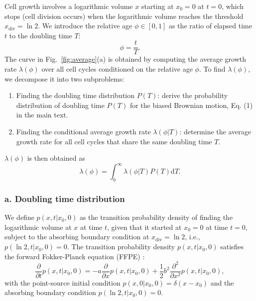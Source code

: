 \documentclass[aps, prl, longbibliography, linenumbers, superscriptaddress]{revtex4-2}
\begin{document}
Cell growth involves a logarithmic volume $x$ starting at $x_0 = 0$ at $t=0$, which stops (cell division occurs) when the logarithmic volume reaches the threshold $x_{\text{div}} = \ln2$. We introduce the relative age $\phi \in [0, 1]$ as the ratio of elapsed time $t$ to the doubling time $T$:
\begin{equation}
	\phi = \frac{t}{T}.
\end{equation}
The curve in Fig.~\ref{fig:average}(a) is obtained by computing the average growth rate $\lambda(\phi)$ over all cell cycles conditioned on the relative age $\phi$. To find $\lambda(\phi)$, we decompose it into two subproblems:
\begin{enumerate}
	\item Finding the doubling time distribution $P(T)$: derive the probability distribution of doubling time $P(T)$ for the biased Brownian motion, Eq. (1) in the main text.
	\item Finding the conditional average growth rate $\lambda(\phi | T)$: determine the average growth rate for all cell cycles that share the same doubling time $T$.
\end{enumerate}
${\lambda(\phi)}$ is then obtained as
\begin{equation}
	\lambda(\phi) = \int_0^\infty \lambda(\phi | T) P(T) \mathrm{d}T.
\end{equation}

\subsubsection{a. Doubling time distribution}

We define $p(x, t | x_0, 0)$ as the transition probability density of finding the logarithmic volume at $x$ at time $t$, given that it started at $x_0 = 0$ at time $t = 0$, subject to the absorbing boundary condition at $x_{\text{div}} = \ln 2$, i.e., $p(\ln 2, t | x_0, 0) = 0$. The transition probability density $p(x, t | x_0, 0)$ satisfies the forward Fokker-Planck equation (FFPE) \cite{Gardiner2009stochastic}:
\begin{equation}
\frac{\partial}{\partial t} p(x, t | x_0, 0) = -a \frac{\partial}{\partial x} p(x, t | x_0, 0) + \frac{1}{2} b^2 \frac{\partial^2}{\partial x^2} p(x, t | x_0, 0),
\label{eq:ffpe}
\end{equation}
with the point-source initial condition $p(x, 0 | x_0, 0) = \delta(x - x_0)$ and the absorbing boundary condition $p(\ln 2, t | x_0, 0) = 0$.
\end{document}
